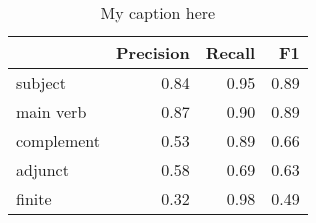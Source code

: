 \begin{table}[!ht]
\centering
\begin{tabular}{lrrr}
\toprule
{} &  Precision &  Recall &   F1 \\
\midrule
subject    &       0.84 &    0.95 & 0.89 \\
main verb  &       0.87 &    0.90 & 0.89 \\
complement &       0.53 &    0.89 & 0.66 \\
adjunct    &       0.58 &    0.69 & 0.63 \\
finite     &       0.32 &    0.98 & 0.49 \\
\bottomrule
\end{tabular}
\caption{My caption here}
\label{tab:unit-elements-mood-combined-F1}
\end{table}